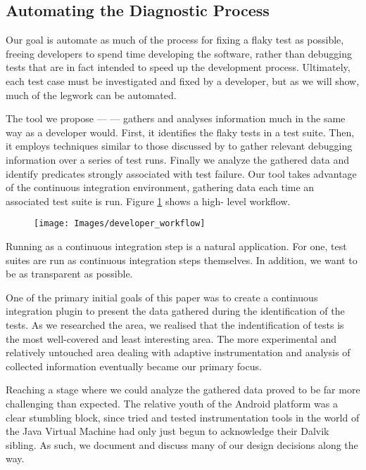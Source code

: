 \subsection{Automating the Diagnostic Process}

Our goal is automate as much of the process for fixing a flaky test as possible,
freeing developers to spend time developing the software, rather than debugging
tests that are in fact intended to speed up the development process. Ultimately,
each test case must be investigated and fixed by a developer, but as we will
show, much of the legwork can be automated.

The tool we propose --- \textit{\splatter} --- gathers and analyses information
much in the same way as a developer would. First, it identifies the flaky tests
in a test suite. Then, it employs techniques similar to those discussed by
\citet{ArumugaNainar:2010:ABI:1806799.1806839} to gather relevant debugging
information over a series of test runs. Finally we analyze the gathered data and
identify predicates strongly associated with test failure. Our tool takes
advantage of the continuous integration environment, gathering data each time an
associated test suite is run. Figure \ref{fig:developer_workflow} shows a high-
level \splatter workflow.

\begin{figure}[h]

\texttt{[image: Images/developer\_workflow]}

\caption{}
\label{fig:developer_workflow}
\end{figure}

Running as a continuous integration step is a natural application. For one, test
suites are run as continuous integration steps themselves. In addition, we want
to be as transparent as possible.

One of the primary initial goals of this paper was to create a continuous
integration plugin to present the data gathered during the identification of the
\flaky tests. As we researched the area, we realised that the indentification of
\flaky tests is the most well-covered and least interesting area. The more
experimental and relatively untouched area dealing with adaptive instrumentation
and analysis of collected information eventually became our primary focus.

Reaching a stage where we could analyze the gathered data proved to be far more
challenging than expected. The relative youth of the Android platform was a
clear stumbling block, since tried and tested instrumentation tools in the world
of the Java Virtual Machine had only just begun to acknowledge their Dalvik
sibling. As such, we document and discuss many of our design decisions along the
way.

